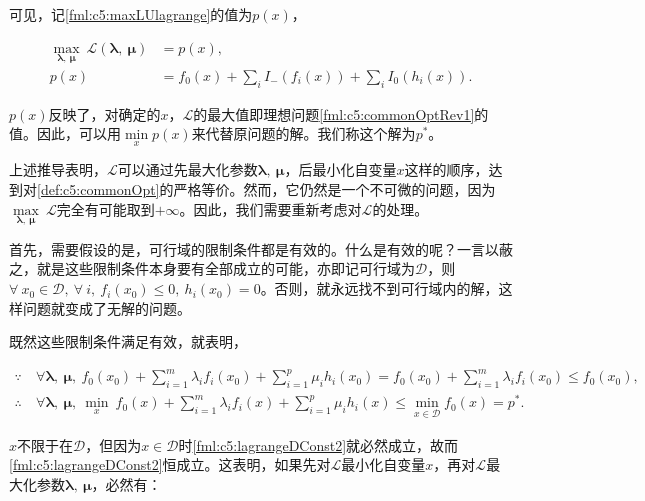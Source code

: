 可见，记\eqref{fml:c5:maxLUlagrange}的值为$p(x)$，

\begin{equation}\label{fml:c5:eqlagrange}
	\begin{aligned}
		\max\limits_{\bm{\lambda},~\bm{\mu}}~\mathcal{L}(\bm{\lambda},~\bm{\mu}) &= p(x),\\ 
		p(x) &= f_0(x)+\sum_{i}{I_-(f_i(x))}+\sum_{i}{I_0(h_i(x))}.
	\end{aligned}
\end{equation}

$p(x)$反映了，对确定的$x$，$\mathcal{L}$的最大值即理想问题\eqref{fml:c5:commonOptRev1}的值。因此，可以用$\min\limits_x p(x)$来代替原问题的解。我们称这个解为$p^{\ast}$。

上述推导表明，$\mathcal{L}$可以通过先最大化参数$\bm{\lambda},~\bm{\mu}$，后最小化自变量$x$这样的顺序，达到对\autoref{def:c5:commonOpt}的严格等价。然而，它仍然是一个不可微的问题，因为$\max\limits_{\bm{\lambda},~\bm{\mu}}~\mathcal{L}$完全有可能取到$+\infty$。因此，我们需要重新考虑对$\mathcal{L}$的处理。

首先，需要假设的是，可行域的限制条件都是有效的。什么是有效的呢？一言以蔽之，就是这些限制条件本身要有全部成立的可能，亦即记可行域为$\mathcal{D}$，则$\forall~x_0 \in \mathcal{D},~\forall~i,~f_i(x_0) \leqslant 0,~h_i(x_0)=0$。否则，就永远找不到可行域内的解，这样问题就变成了无解的问题。

既然这些限制条件满足有效，就表明，

\begin{subequations}
	\renewcommand{\theequation}
	{\theparentequation-\arabic{equation}}
	\begin{align}
	\because~&\forall \bm{\lambda},~\bm{\mu},~f_0(x_0) + \sum_{i=1}^m{\lambda_i f_i(x_0)} + \sum_{i=1}^p{\mu_i h_i(x_0)} = f_0(x_0) + \sum_{i=1}^m{\lambda_i f_i(x_0)} \leqslant f_0(x_0), \label{fml:c5:lagrangeDConst1} \\
	\therefore~&\forall \bm{\lambda},~\bm{\mu},~\min\limits_{x}~f_0(x) + \sum_{i=1}^m{\lambda_i f_i(x)} + \sum_{i=1}^p{\mu_i h_i(x)} \leqslant \min\limits_{x \in \mathcal{D}} f_0(x) = p^{\ast} \label{fml:c5:lagrangeDConst2}.
	\end{align}
\end{subequations}

$x$不限于在$\mathcal{D}$，但因为$x \in \mathcal{D}$时\eqref{fml:c5:lagrangeDConst2}就必然成立，故而\eqref{fml:c5:lagrangeDConst2}恒成立。这表明，如果先对$\mathcal{L}$最小化自变量$x$，再对$\mathcal{L}$最大化参数$\bm{\lambda},~\bm{\mu}$，必然有：


